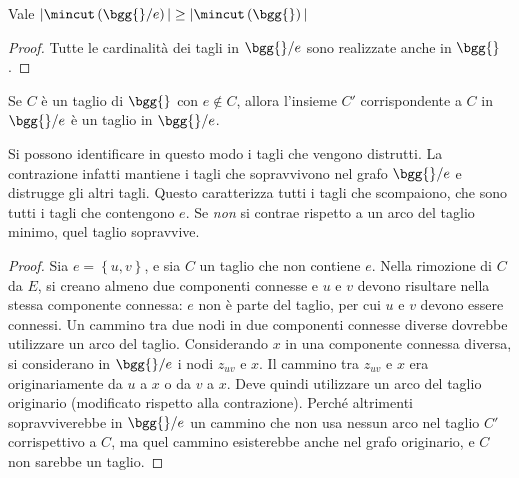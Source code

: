 \begin{corollario}
    Vale
    $
        |
        \mincut
        \left( 
            \bgg{} / e
        \right)
        |
        \geq
        |
        \mincut
        \left( 
            \bgg{}
        \right)
        |
    $
    \begin{proof}
        Tutte le cardinalità dei tagli in $
        \bgg{} / e
        $ sono realizzate anche in $
        \bgg{}
        $.
    \end{proof}
\end{corollario}
\begin{corollario}
    Se $C$ è un taglio di $
    \bgg{}
    $ con $
    e \notin C
    $, allora l'insieme $C'$ corrispondente a $C$ in $
    \bgg{} / e
    $ è un taglio in $
    \bgg{} / e
    $.
\end{corollario}
\noindent
Si possono identificare in questo modo i tagli che vengono distrutti.
La contrazione infatti mantiene i tagli che sopravvivono nel grafo $
\bgg{} / e
$ e distrugge gli altri tagli.
Questo caratterizza tutti i tagli che scompaiono, che sono tutti i tagli che contengono $e$.
Se \emph{non} si contrae rispetto a un arco del taglio minimo, quel taglio sopravvive.
\begin{proof}
    Sia $
    e = \left\{ u,v \right\}
    $, e sia $C$ un taglio che non contiene $e$.
    Nella rimozione di $C$ da $E$, si creano almeno due componenti connesse e
    $u$ e $v$
    devono risultare nella stessa componente connessa: $e$ non è parte del taglio, per cui 
    $u$ e $v$
    devono essere connessi.
    Un cammino tra due nodi in due componenti connesse diverse dovrebbe utilizzare un arco del taglio.
    Considerando $x$ in una componente connessa diversa, si considerano in $
    \bgg{} / e
    $ i nodi $
    z_{uv}
    $ e $x$.
    Il cammino tra $
    z_{uv}
    $ e $x$ era originariamente da 
    $u$ a $x$
    o da
    $v$ a $x$.
    Deve quindi utilizzare un arco del taglio originario (modificato rispetto alla contrazione).
    Perché altrimenti sopravviverebbe in $
    \bgg{} / e
    $ un cammino che non usa nessun arco nel taglio $C'$ corrispettivo a $C$, ma quel cammino esisterebbe anche nel grafo originario, e $C$ non sarebbe un taglio.
\end{proof}

